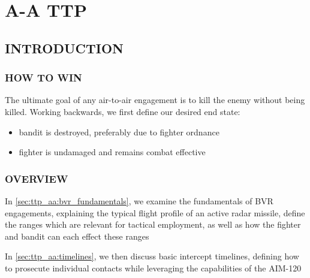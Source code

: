 \chapter{A-A TTP}
\localtableofcontents
\thispagestyle{plain}
\cleardoublepage

\section{INTRODUCTION}
\subsection{HOW TO WIN}
\begin{tcoloritemize}
    \blueitem[Goal]
    The ultimate goal of any air-to-air engagement is to kill the enemy without being killed. 
    Working backwards, we first define our desired end state:
    \begin{itemize}
        \item bandit is destroyed, preferably due to fighter ordnance
        \item fighter is undamaged and remains combat effective
    \end{itemize}
\end{tcoloritemize}

\subsection{OVERVIEW}
\begin{tcoloritemize}
    \blueitem[Fundamentals] 
    In \cref{sec:ttp_aa:bvr_fundamentals}, 
    we examine the fundamentals of BVR engagements, 
    explaining the typical flight profile of an active radar missile,
    define the ranges which are relevant for tactical employment,
    as well as how the fighter and bandit can each effect these ranges

    In \cref{sec:ttp_aa:timelines}, 
    we then discuss basic intercept timelines, 
    defining how to prosecute individual contacts while leveraging the capabilities of the AIM-120
    

\end{tcoloritemize}

\clearpage


